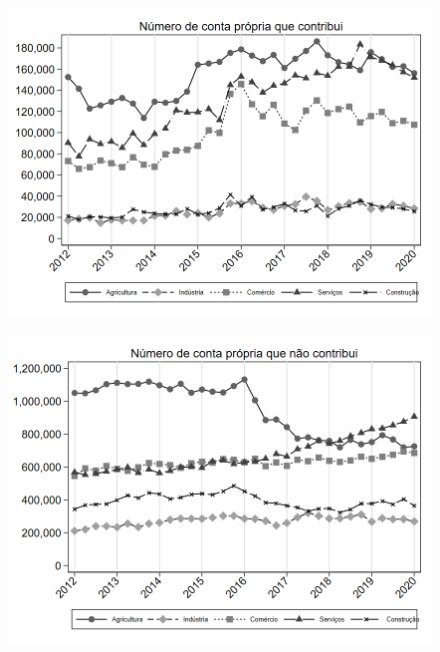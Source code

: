\begin{frame}[label=_composicao_demografica_setor_n_cpropriaC]{}
\textit{\hyperlink{_composicao_demografica_setor}{}}
\begin{figure}
  \centering
  \includegraphics[width=1.0\linewidth]{../../analysis/output/composicao_demografica/setor/_composicao_demografica_setor_n_cpropriaC.png}
  \caption{}
  \label{fig:_composicao_demografica_setor_n_cpropriaC}
\end{figure}
\end{frame}

\begin{frame}[label=_composicao_demografica_setor_n_cpropriaNc]{}
\textit{\hyperlink{_composicao_demografica_setor}{}}
\begin{figure}
  \centering
  \includegraphics[width=1.0\linewidth]{../../analysis/output/composicao_demografica/setor/_composicao_demografica_setor_n_cpropriaNc.png}
  \caption{}
  \label{fig:_composicao_demografica_setor_n_cpropriaNc}
\end{figure}
\end{frame}